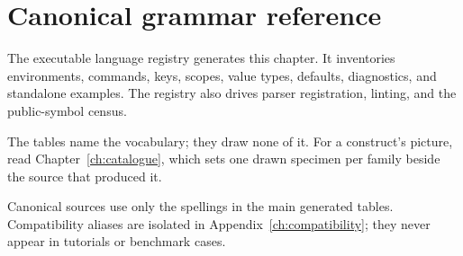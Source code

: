 \section{Canonical grammar reference}\label{ch:reference}

The executable language registry generates this chapter.  It inventories
environments, commands, keys, scopes, value types, defaults, diagnostics, and
standalone examples.  The registry also drives parser registration, linting,
and the public-symbol census.

The tables name the vocabulary; they draw none of it.  For a construct's
picture, read Chapter~\ref{ch:catalogue}, which sets one drawn specimen per
family beside the source that produced it.


Canonical sources use only the spellings in the main generated tables.
Compatibility aliases are isolated in Appendix~\ref{ch:compatibility}; they
never appear in tutorials or benchmark cases.
